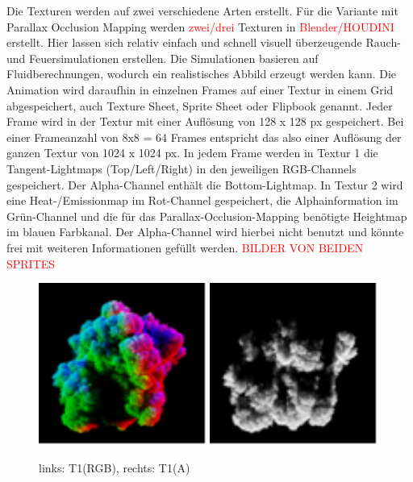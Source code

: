 Die Texturen werden auf zwei verschiedene Arten erstellt. Für die Variante mit Parallax Occlusion Mapping werden \textcolor{red}{zwei/drei}
Texturen in \textcolor{red}{Blender/HOUDINI} erstellt. Hier lassen sich relativ einfach und schnell visuell überzeugende Rauch- und
Feuersimulationen erstellen. Die Simulationen basieren auf Fluidberechnungen, wodurch ein realistisches Abbild erzeugt werden kann.
Die Animation wird daraufhin in einzelnen Frames auf einer Textur in einem Grid abgespeichert, auch Texture Sheet, Sprite Sheet oder Flipbook genannt.
Jeder Frame wird in der Textur mit einer Auflösung von 128 x 128 px gespeichert. Bei einer Frameanzahl von 8x8 = 64 Frames entspricht das also
einer Auflösung der ganzen Textur von 1024 x 1024 px.
In jedem Frame werden in Textur 1 die Tangent-Lightmaps (Top/Left/Right) in den jeweiligen RGB-Channels gespeichert.
Der Alpha-Channel enthält die Bottom-Lightmap. In Textur 2 wird eine Heat-/Emissionmap im Rot-Channel gespeichert, die Alphainformation im
Grün-Channel und die für das Parallax-Occlusion-Mapping benötigte Heightmap im blauen Farbkanal. Der Alpha-Channel wird hierbei nicht benutzt und könnte frei mit weiteren 
Informationen gefüllt werden. 
\textcolor{red}{BILDER VON BEIDEN SPRITES}

\begin{figure}[h]
	\centering
	\includegraphics[width=0.49\textwidth]{Grafiken/Implementation/T1_RGB.png}
	\includegraphics[width=0.49\textwidth]{Grafiken/Implementation/T1_A.png}
	\begin{footnotesize}
		\caption{links: T1(RGB), rechts: T1(A)}
	\end{footnotesize}
\end{figure}


